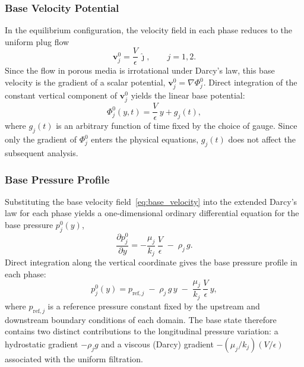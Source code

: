 \subsubsection{Base Velocity Potential}

In the equilibrium configuration, the velocity field in each phase reduces to the uniform plug flow
\begin{equation}
\label{eq:base_velocity}
\mathbf{v}_j^0 = \frac{V}{\epsilon}\,\hat{\jmath},\qquad j = 1, 2.
\end{equation}
Since the flow in porous media is irrotational under Darcy's law, this base velocity is the gradient of a scalar potential, $\mathbf{v}_j^0 = \nabla \Phi_j^0$. Direct integration of the constant vertical component of $\mathbf{v}_j^0$ yields the linear base potential:
\begin{equation}
\label{eq:base_potential}
\Phi_j^0(y, t) = \frac{V}{\epsilon}\,y + g_j(t),
\end{equation}
where $g_j(t)$ is an arbitrary function of time fixed by the choice of gauge. Since only the gradient of $\Phi_j^0$ enters the physical equations, $g_j(t)$ does not affect the subsequent analysis.

\subsubsection{Base Pressure Profile}

Substituting the base velocity field~\eqref{eq:base_velocity} into the extended Darcy's law for each phase yields a one-dimensional ordinary differential equation for the base pressure $p_j^0(y)$,
\begin{equation}
\label{eq:base_pressure_ode}
\frac{\partial p_j^0}{\partial y} = -\frac{\mu_j}{k_j}\,\frac{V}{\epsilon} \;-\; \rho_j\, g.
\end{equation}
Direct integration along the vertical coordinate gives the base pressure profile in each phase:
\begin{equation}
\label{eq:base_pressure}
p_j^0(y) = p_{\mathrm{ref},j} \;-\; \rho_j\, g\, y \;-\; \frac{\mu_j}{k_j}\,\frac{V}{\epsilon}\, y,
\end{equation}
where $p_{\mathrm{ref},j}$ is a reference pressure constant fixed by the upstream and downstream boundary conditions of each domain. The base state therefore contains two distinct contributions to the longitudinal pressure variation: a hydrostatic gradient $-\rho_j g$ and a viscous (Darcy) gradient $-(\mu_j/k_j)(V/\epsilon)$ associated with the uniform filtration.

